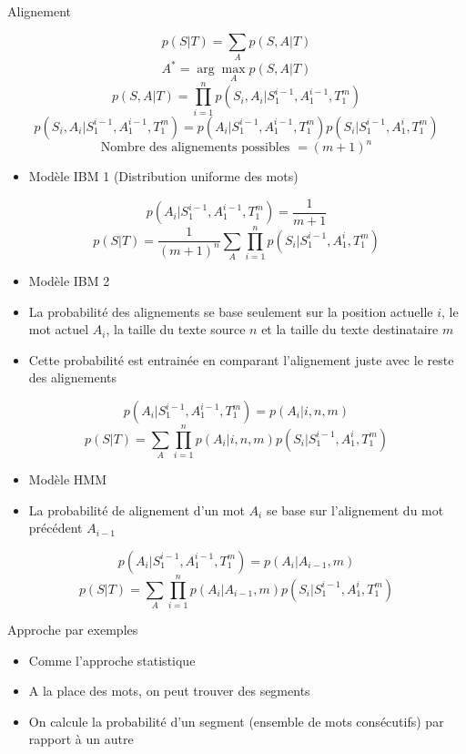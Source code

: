\documentclass{KodeBook}
\begin{document}
Alignement 

\[p(S|T) = \sum_{A} p(S, A | T)\]
\[A^* = \arg\max_A p(S, A | T)\]
\[p(S, A | T) = \prod_{i=1}^{n} p(S_i, A_i | S_1^{i-1}, A_1^{i-1}, T_1^{m})\]
\[p(S_i, A_i | S_1^{i-1}, A_1^{i-1}, T_1^{m}) = p(A_i | S_1^{i-1}, A_1^{i-1}, T_1^{m}) p(S_i | S_1^{i-1}, A_1^{i}, T_1^{m})\]
\[ \text{Nombre des alignements possibles } = (m + 1)^n\]

\begin{itemize}
	\item Modèle IBM 1 (Distribution uniforme des mots)
\end{itemize}

\[p(A_i | S_1^{i-1}, A_1^{i-1}, T_1^{m}) = \frac{1}{m+1}\]
\[p(S|T) = \frac{1}{(m+1)^n} \sum_{A} \prod_{i=1}^{n} p(S_i | S_1^{i-1}, A_1^{i}, T_1^{m})\]

\begin{itemize}
	\item Modèle IBM 2
	\item La probabilité des alignements se base seulement sur la position actuelle $i$, le mot actuel $A_i$, la taille du texte source $n$ et la taille du texte destinataire $m$
	\item Cette probabilité est entrainée en comparant l'alignement juste avec le reste des alignements
\end{itemize}

\[p(A_i | S_1^{i-1}, A_1^{i-1}, T_1^{m}) = p(A_i | i, n, m)\]
\[p(S|T) = \sum_{A} \prod_{i=1}^{n} p(A_i | i, n, m) p(S_i | S_1^{i-1}, A_1^{i}, T_1^{m})\]

\begin{itemize}
	\item Modèle HMM
	\item La probabilité de alignement d'un mot $A_i$ se base sur l'alignement du mot précédent $A_{i-1}$
\end{itemize}

\[p(A_i | S_1^{i-1}, A_1^{i-1}, T_1^{m}) = p(A_i | A_{i-1}, m)\]
\[p(S|T) = \sum_{A} \prod_{i=1}^{n} p(A_i | A_{i-1}, m) p(S_i | S_1^{i-1}, A_1^{i}, T_1^{m})\]

Approche par exemples

\begin{itemize}
	\item Comme l'approche statistique
	\item A la place des mots, on peut trouver des segments
	\item On calcule la probabilité d'un segment (ensemble de mots consécutifs) par rapport à un autre
\end{itemize}
\end{document}
